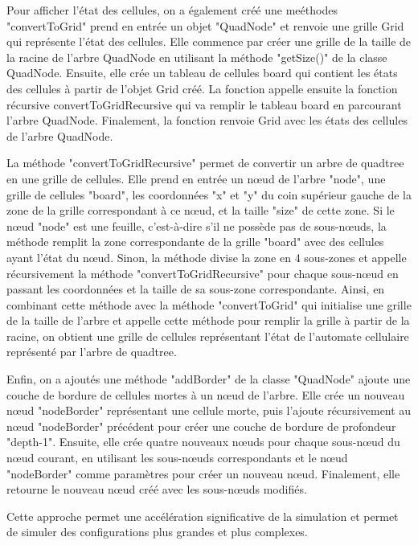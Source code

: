 Pour afficher l'état des cellules,  on a également créé  une meéthodes "convertToGrid"  prend en entrée un objet "QuadNode" et renvoie une grille Grid qui représente l'état des cellules. Elle commence par créer une grille de la taille de la racine de l'arbre QuadNode en utilisant la méthode "getSize()" de la classe QuadNode. Ensuite, elle crée un tableau de cellules board qui contient les états des cellules à partir de l'objet Grid créé. La fonction appelle ensuite la fonction récursive convertToGridRecursive qui va remplir le tableau board en parcourant l'arbre QuadNode. Finalement, la fonction renvoie  Grid avec les états des cellules de l'arbre QuadNode.\newline

La méthode "convertToGridRecursive" permet de convertir un arbre de quadtree en une grille de cellules. Elle prend en entrée un nœud de l'arbre "node", une grille de cellules "board", les coordonnées "x" et "y" du coin supérieur gauche de la zone de la grille correspondant à ce nœud, et la taille "size" de cette zone. Si le nœud "node" est une feuille, c'est-à-dire s'il ne possède pas de sous-nœuds, la méthode remplit la zone correspondante de la grille "board" avec des cellules ayant l'état du nœud. Sinon, la méthode divise la zone en 4 sous-zones et appelle récursivement la méthode "convertToGridRecursive" pour chaque sous-nœud en passant les coordonnées et la taille de sa sous-zone correspondante. Ainsi, en combinant cette méthode avec la méthode "convertToGrid" qui initialise une grille de la taille de l'arbre et appelle cette méthode pour remplir la grille à partir de la racine, on obtient une grille de cellules représentant l'état de l'automate cellulaire représenté par l'arbre de quadtree.\newline

Enfin, on a ajoutés une méthode "addBorder" de la classe "QuadNode" ajoute une couche de bordure de cellules mortes à un nœud de l'arbre. Elle crée un nouveau nœud "nodeBorder" représentant une cellule morte, puis l'ajoute récursivement au nœud "nodeBorder" précédent pour créer une couche de bordure de profondeur "depth-1". Ensuite, elle crée quatre nouveaux nœuds pour chaque sous-nœud du nœud courant, en utilisant les sous-nœuds correspondants et le nœud "nodeBorder" comme paramètres pour créer un nouveau nœud. Finalement, elle retourne le nouveau nœud créé avec les sous-nœuds modifiés.\newline

Cette approche permet une accélération significative de la simulation et permet de simuler des configurations plus grandes et plus complexes.
